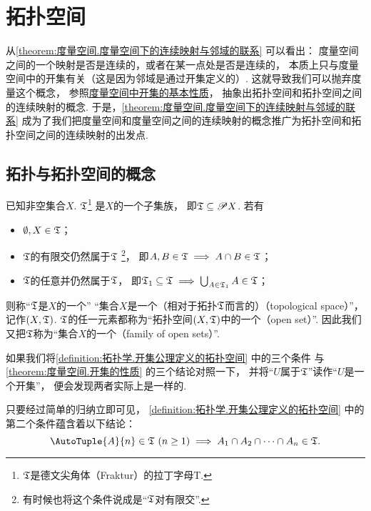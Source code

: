 \section{拓扑空间}
从\cref{theorem:度量空间.度量空间下的连续映射与邻域的联系} 可以看出：
度量空间之间的一个映射是否是连续的，或者在某一点处是否是连续的，
本质上只与度量空间中的开集有关（这是因为邻域是通过开集定义的）.
这就导致我们可以抛弃度量这个概念，
参照\hyperref[theorem:度量空间.开集的性质]{度量空间中开集的基本性质}，
抽象出拓扑空间和拓扑空间之间的连续映射的概念.
于是，\cref{theorem:度量空间.度量空间下的连续映射与邻域的联系}
成为了我们把度量空间和度量空间之间的连续映射的概念推广为拓扑空间和拓扑空间之间的连续映射的出发点.

\subsection{拓扑与拓扑空间的概念}
\begin{definition}\label{definition:拓扑学.开集公理定义的拓扑空间}
已知非空集合\(X\).
\(\mathfrak T\)\footnote{\(\mathfrak T\)是德文尖角体（Fraktur）的拉丁字母T.}
是\(X\)的一个子集族，
即\(\mathfrak T \subseteq \mathscr{P} X\).
若有\begin{itemize}
	\item \(\emptyset,X \in \mathfrak T\)；
	\item \(\mathfrak T\)的有限交仍然属于\(\mathfrak T\)%
	\footnote{有时候也将这个条件说成是“\(\mathfrak T\)对有限交”.}，
	即\(A,B \in \mathfrak T \implies A \cap B \in \mathfrak T\)；
	\item \(\mathfrak T\)的任意并仍然属于\(\mathfrak T\)，
	即\(\mathfrak T_1 \subseteq \mathfrak T \implies \bigcup_{A \in \mathfrak T_1} A \in \mathfrak T\)；
\end{itemize}
则称“\(\mathfrak T\)是\(X\)的一个”
“集合\(X\)是一个（相对于拓扑\(\mathfrak T\)而言的）（topological space）”，
记作\((X,\mathfrak T)\).
\(\mathfrak T\)的任一元素都称为“拓扑空间\((X,\mathfrak T)\)中的一个（open set）”.
因此我们又把\(\mathfrak T\)称为“集合\(X\)的一个（family of open sets）”.
\end{definition}
如果我们将\cref{definition:拓扑学.开集公理定义的拓扑空间} 中的三个条件
与\cref{theorem:度量空间.开集的性质} 的三个结论对照一下，
并将“\(U\)属于\(\mathfrak T\)”读作“\(U\)是一个开集”，
便会发现两者实际上是一样的.

只要经过简单的归纳立即可见，
\cref{definition:拓扑学.开集公理定义的拓扑空间} 中的第二个条件蕴含着以下结论：\[
	\AutoTuple{A}{n}\in\T\ (n\geq1)
	\implies
	A_1 \cap A_2 \cap \dotsb \cap A_n \in \T.
\]


